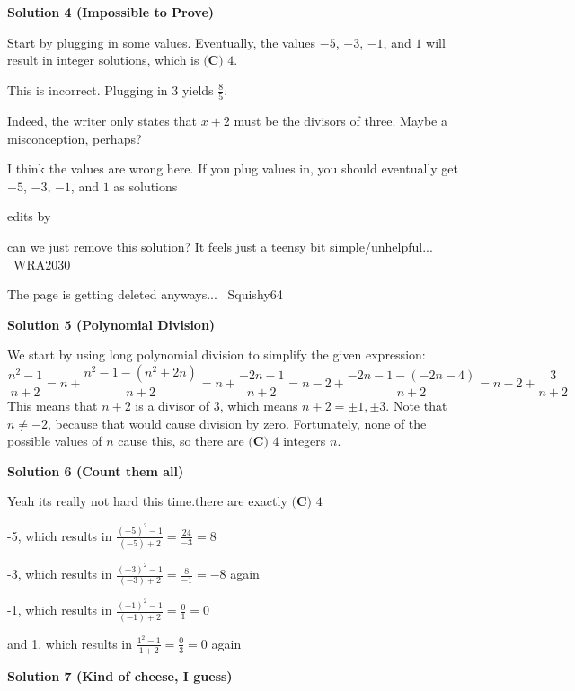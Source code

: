 \begin{enumerate}
 



\textbf{Solution 4 (Impossible to Prove)}

Start by plugging in some values. Eventually, the values $-5$, $-3$, $-1$, and $1$ will result in integer solutions, which is $\boxed{\textbf{(C) } 4}$.

 This is incorrect. Plugging in 3 yields $\frac{8}{5}$.

 Indeed, the writer only states that $x+2$ must be the divisors of three. Maybe a misconception, perhaps?

 I think the values are wrong here. If you plug values in, you should eventually get $-5$, $-3$, $-1$, and $1$ as solutions

 edits by

 can we just remove this solution?  It feels just a teensy bit simple/unhelpful... ~WRA2030

 The page is getting deleted anyways... ~Squishy64

 



\textbf{Solution 5 (Polynomial Division)}

We start by using long polynomial division to simplify the given expression:
 \[\frac{n^2-1}{n+2}=n+\frac{n^2-1-(n^2+2n)}{n+2}=n+\frac{-2n-1}{n+2}=n-2+\frac{-2n-1-(-2n-4)}{n+2}=n-2+\frac{3}{n+2}\]This means that $n+2$ is a divisor of $3$, which means $n+2=\pm 1, \pm 3$. Note that $n \neq -2$, because that would cause division by zero. Fortunately, none of the possible values of $n$ cause this, so there are $\boxed{\textbf{(C) } 4}$ integers $n$.

 



\textbf{Solution 6 (Count them all)}

Yeah its really not hard this time.there are exactly $\boxed{\textbf{(C) } 4}$

 -5, which results in $\frac{(-5)^2-1}{(-5)+2}=\frac{24}{-3}=8$

 -3, which results in $\frac{(-3)^2-1}{(-3)+2}=\frac{8}{-1}=-8$ again

 -1, which results in $\frac{(-1)^2-1}{(-1)+2}=\frac{0}{1}=0$

 and 1, which results in $\frac{1^2-1}{1+2}=\frac{0}{3}=0$ again

 


 



\textbf{Solution 7 (Kind of cheese, I guess)}


\end{enumerate}
